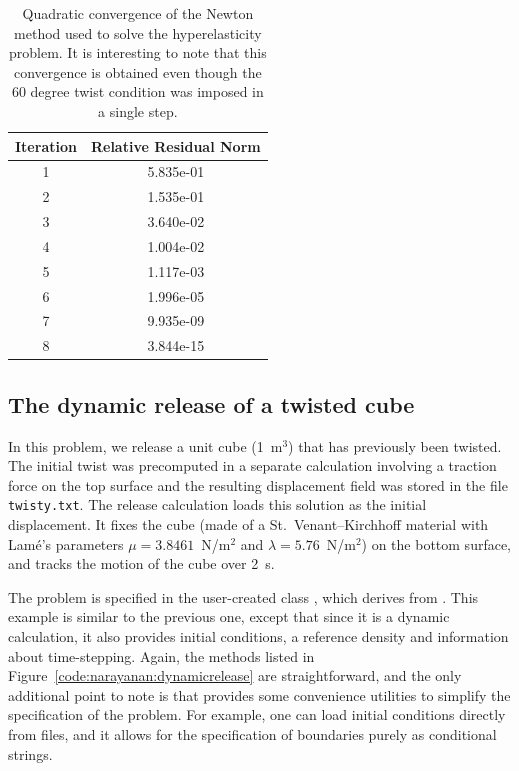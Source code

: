 \begin{table}
  \centering
  \begin{tabular}{|c|c|}
    \hline Iteration & Relative Residual Norm \\
    \hline
    1 & 5.835e-01\\
    2 & 1.535e-01\\
    3 & 3.640e-02\\
    4 & 1.004e-02\\
    5 & 1.117e-03\\
    6 & 1.996e-05\\
    7 & 9.935e-09\\
    8 & 3.844e-15\\
    \hline
  \end{tabular}
  \caption{Quadratic convergence of the Newton method used to solve
    the hyperelasticity problem. It is interesting to note that this
    convergence is obtained even though the 60 degree twist condition
    was imposed in a single step.}
  \label{tab:narayanan:residualnorms}
\end{table}

\subsection{The dynamic release of a twisted cube}

In this problem, we release a unit cube (1~m$^3$) that has previously
been twisted. The initial twist was precomputed in a separate
calculation involving a traction force on the top surface and the
resulting displacement field was stored in the file {\tt
twisty.txt}. The release calculation loads this solution as the
initial displacement. It fixes the cube (made of a
St.~Venant--Kirchhoff material with Lam\'e's parameters $\mu =
3.8461$~N/m$^2$ and $\lambda = 5.76$~N/m$^2$) on the bottom surface,
and tracks the motion of the cube over 2~s.

The problem is specified in the user-created class ,
which derives from . This example is similar to
the previous one, except that since it is a dynamic calculation, it also
provides initial conditions, a reference density and information about
time-stepping. Again, the methods listed in
Figure~\ref{code:narayanan:dynamicrelease} are straightforward, and
the only additional point to note is that \twist{} provides some
convenience utilities to simplify the specification of the
problem. For example, one can load initial conditions directly from
files, and it allows for the specification of boundaries purely as
conditional strings.

